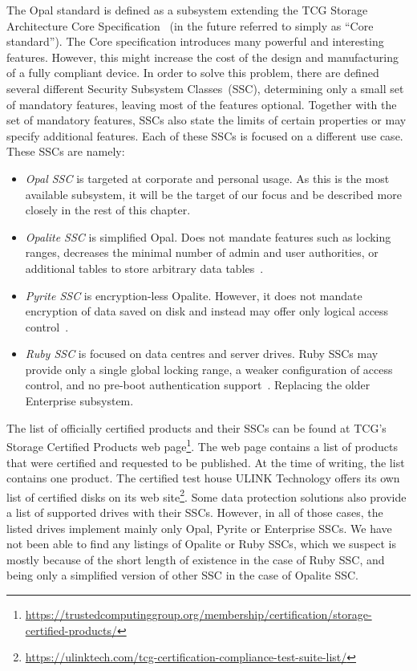 The Opal standard is defined as a subsystem extending the TCG Storage Architecture Core Specification~\cite{tcg-storage-core} (in the future referred to simply as ``Core standard''). 
The Core specification introduces many powerful and interesting features. However, this might increase the cost of the design and manufacturing of a fully compliant device. In order to solve this problem, there are defined several different Security Subsystem Classes~(SSC), determining only a small set of mandatory features, leaving most of the features optional. Together with the set of mandatory features, SSCs also state the limits of certain properties or may specify additional features.
Each of these SSCs is focused on a different use case. These SSCs are namely: \begin{itemize}
    \item \emph{Opal SSC} is targeted at corporate and personal usage. As this is the most available subsystem, it will be the target of our focus and be described more closely in the rest of this chapter.
    \item \emph{Opalite SSC} is simplified Opal. Does not mandate features such as locking ranges, decreases the minimal number of admin and user authorities, or additional tables to store arbitrary data tables~\cite{tcg-opalite}. %
    \item \emph{Pyrite SSC} is encryption-less Opalite. However, it does not mandate encryption of data saved on disk and instead may offer only logical access control~\cite{tcg-pyrite}.
    \item \emph{Ruby SSC} is focused on data centres and server drives. Ruby SSCs may provide only a single global locking range, a weaker configuration of access control, and no pre-boot authentication support~\cite{tcg-ruby}. Replacing the older Enterprise subsystem.
\end{itemize}
The list of officially certified products and their SSCs can be found at TCG's Storage Certified Products web page\footnote{\url{https://trustedcomputinggroup.org/membership/certification/storage-certified-products/}}. The web page contains a list of products that were certified and requested to be published. At the time of writing, the list contains one product. The certified test house ULINK Technology offers its own list of certified disks on its web site\footnote{\url{https://ulinktech.com/tcg-certification-compliance-test-suite-list/}}. Some data protection solutions also provide a list of supported drives with their SSCs. However, in all of those cases, the listed drives implement mainly only Opal, Pyrite or Enterprise SSCs. We have not been able to find any listings of Opalite or Ruby SSCs, which we suspect is mostly because of the short length of existence in the case of Ruby SSC, and being only a simplified version of other SSC in the case of Opalite SSC.


